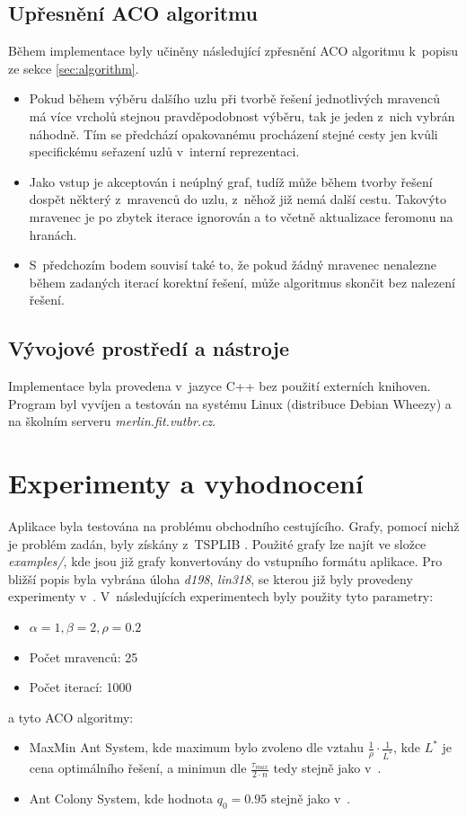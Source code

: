 \documentclass[a4paper, 12pt]{article}
\begin{document}
\subsection{Upřesnění ACO algoritmu}
Během implementace byly učiněny následující zpřesnění ACO algoritmu k~popisu ze sekce \ref{sec:algorithm}.
\begin{itemize}
  \item Pokud během výběru dalšího uzlu při tvorbě řešení jednotlivých mravenců má více vrcholů stejnou pravděpodobnost výběru, tak je jeden z~nich vybrán náhodně.
  Tím se předchází opakovanému procházení stejné cesty jen kvůli specifickému seřazení uzlů v~interní reprezentaci.
  \item Jako vstup je akceptován i neúplný graf, tudíž může během tvorby řešení dospět některý z~mravenců do uzlu, z~něhož již nemá další cestu. Takovýto mravenec
  je po zbytek iterace ignorován a to včetně aktualizace feromonu na hranách.
  \item S~předchozím bodem souvisí také to, že pokud žádný mravenec nenalezne během zadaných iterací korektní řešení, může algoritmus skončit bez nalezení
  řešení.
\end{itemize}

\subsection{Vývojové prostředí a nástroje}
Implementace byla provedena v~jazyce C++ bez použití externích knihoven. Program byl vyvíjen a testován na systému Linux (distribuce Debian Wheezy) a na školním
serveru \emph{merlin.fit.vutbr.cz}.

\section{Experimenty a vyhodnocení}
\label{sec:eval}
Aplikace byla testována na problému obchodního cestujícího. Grafy, pomocí nichž je problém zadán, byly získány z~TSPLIB \cite{TSPLIB}.
Použité grafy lze najít ve složce \emph{examples/}, kde jsou již grafy konvertovány do vstupního formátu aplikace. Pro bližší popis
byla vybrána úloha \emph{d198}, \emph{lin318}, se kterou již byly provedeny experimenty v~\cite{aco:maxmintsp,aco:acs}. V~následujících experimentech
byly použity tyto parametry:
  \begin{itemize}
    \item $\alpha=1, \beta=2, \rho=0.2$
    \item Počet mravenců: 25
    \item Počet iterací: 1000
  \end{itemize}
a tyto ACO algoritmy:
\begin{itemize}
  \item MaxMin Ant System, kde maximum bylo zvoleno dle vztahu $\frac{1}{\rho}\cdot\frac{1}{L^*}$, kde $L^*$ je cena optimálního řešení,
  a minimun dle $\frac{\tau_{max}}{2\cdot n}$ tedy stejně jako v~\cite{aco:maxmintsp}.
  \item Ant Colony System, kde hodnota $q_0=0.95$ stejně jako v~\cite{aco:acs}.
\end{itemize}
\end{document}
